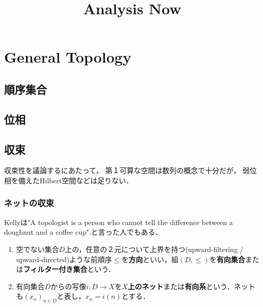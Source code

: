 \documentclass[uplatex,dvipdfmx]{jsreport}
\title{Analysis Now}
\author{}
\begin{document}
\tableofcontents

\chapter{General Topology}

\section{順序集合}

\section{位相}

\section{収束}

\begin{tcolorbox}[colframe=ForestGreen, colback=ForestGreen!10!white,breakable,colbacktitle=ForestGreen!40!white,coltitle=black,fonttitle=\bfseries\sffamily,
title=]
    収束性を議論するにあたって，
    第１可算な空間は数列の概念で十分だが，
    弱位相を備えたHilbert空間などは足りない．
\end{tcolorbox}

\subsection{ネットの収束}

\begin{tcolorbox}[colframe=ForestGreen, colback=ForestGreen!10!white,breakable,colbacktitle=ForestGreen!40!white,coltitle=black,fonttitle=\bfseries\sffamily,
title=]
    Kellyは"A topologist is a person who cannot tell the difference between a doughnut and a coffee cup".と言った人でもある．
\end{tcolorbox}

\begin{definition}\mbox{}
    \begin{enumerate}
        \item 空でない集合$D$上の，任意の２元について上界を持つ(upward-filtering / upward-directed)ような前順序$\le$を\textbf{方向}といい，組$(D,\le)$を\textbf{有向集合}または\textbf{フィルター付き集合}という．
        \item 有向集合$D$からの写像$i:D\to X$を\textbf{$X$上のネット}または\textbf{有向系}という．ネットも$(x_n)_{n\in D}$と表し，$x_n=i(n)$とする．
    \end{enumerate}
\end{definition}
\end{document}
